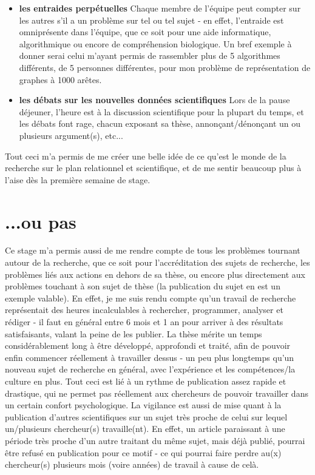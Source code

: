 \documentclass[12pt]{report}
\begin{document}
\begin{spacing}{1.2}
\begin{itemize}
\item \textbf{les entraides perpétuelles}
	\newline
	Chaque membre de l'équipe peut compter sur les autres s'il a un problème sur tel ou tel sujet - en effet, l'entraide est omniprésente dans l'équipe, que ce soit pour une aide informatique, algorithmique ou encore de compréhension biologique. Un bref exemple à donner serai celui m'ayant permis de rassembler plus de 5 algorithmes différents, de 5 personnes différentes, pour mon problème de représentation de graphes à 1000 arêtes.
\item \textbf{les débats sur les nouvelles données scientifiques}
	\newline
	Lors de la pause déjeuner, l'heure est à la discussion scientifique pour la plupart du temps, et les débats font rage, chacun exposant sa thèse, annonçant/dénonçant un ou plusieurs argument(s), etc...
\end{itemize}
Tout ceci m'a permis de me créer une belle idée de ce qu'est le monde de la recherche sur le plan relationnel et scientifique, et de me sentir beaucoup plus à l'aise dès la première semaine de stage.

\section{...ou pas}

Ce stage m'a permis aussi de me rendre compte de tous les problèmes tournant autour de la recherche, que ce soit pour l'accréditation des sujets de recherche, les problèmes liés aux actions en dehors de sa thèse, ou encore plus directement aux problèmes touchant à son sujet de thèse (la publication du sujet en est un exemple valable).
\newline
En effet, je me suis rendu compte qu'un travail de recherche représentait des heures incalculables à rechercher, programmer, analyser et rédiger - il faut en général entre 6 mois et 1 an pour arriver à des résultats satisfaisants, valant la peine de les publier.
\newline
La thèse mérite un temps considérablement long à être développé, approfondi et traité, afin de pouvoir enfin commencer réellement à travailler dessus - un peu plus longtemps qu'un nouveau sujet de recherche en général, avec l'expérience et les compétences/la culture en plus.
\newline
Tout ceci est lié à un rythme de publication assez rapide et drastique, qui ne permet pas réellement aux chercheurs de pouvoir travailler dans un certain confort psychologique.
\newline
La vigilance est aussi de mise quant à la publication d'autres scientifiques sur un sujet très proche de celui sur lequel un/plusieurs chercheur(s) travaille(nt). En effet, un article paraissant à une période très proche d'un autre traitant du même sujet, mais déjà publié, pourrai être refusé en publication pour ce motif - ce qui pourrai faire perdre au(x) chercheur(s) plusieurs mois (voire années) de travail à cause de celà.


\end{spacing}
\end{document}
